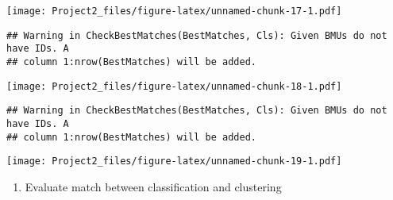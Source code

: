 \documentclass[
]{article}
\newenvironment{Shaded}{\begin{snugshade}}{\end{snugshade}}
\newcommand{\AttributeTok}[1]{\textcolor[rgb]{0.13,0.29,0.53}{#1}}
\newcommand{\DecValTok}[1]{\textcolor[rgb]{0.00,0.00,0.81}{#1}}
\newcommand{\FunctionTok}[1]{\textcolor[rgb]{0.13,0.29,0.53}{\textbf{#1}}}
\newcommand{\NormalTok}[1]{#1}
\newcommand{\OtherTok}[1]{\textcolor[rgb]{0.56,0.35,0.01}{#1}}
\newcommand{\SpecialCharTok}[1]{\textcolor[rgb]{0.81,0.36,0.00}{\textbf{#1}}}
\providecommand{\tightlist}{%
  \setlength{\itemsep}{0pt}\setlength{\parskip}{0pt}}
\begin{document}
\texttt{[image: Project2\_files/figure-latex/unnamed-chunk-17-1.pdf]}

\begin{Shaded}
\end{Shaded}

\begin{verbatim}
## Warning in CheckBestMatches(BestMatches, Cls): Given BMUs do not have IDs. A
## column 1:nrow(BestMatches) will be added.
\end{verbatim}

\texttt{[image: Project2\_files/figure-latex/unnamed-chunk-18-1.pdf]}

\begin{Shaded}
\end{Shaded}

\begin{verbatim}
## Warning in CheckBestMatches(BestMatches, Cls): Given BMUs do not have IDs. A
## column 1:nrow(BestMatches) will be added.
\end{verbatim}

\texttt{[image: Project2\_files/figure-latex/unnamed-chunk-19-1.pdf]}

\begin{enumerate}
\def\labelenumi{\arabic{enumi}.}
\setcounter{enumi}{3}
\tightlist
\item
  Evaluate match between classification and clustering
\end{enumerate}

\begin{Shaded}
\end{Shaded}
\end{document}
